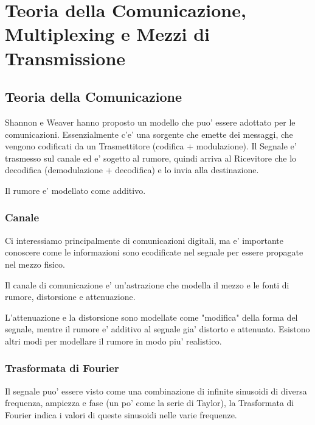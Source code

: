 \chapter{Teoria della Comunicazione, Multiplexing e Mezzi di Transmissione}

\section{Teoria della Comunicazione}

Shannon e Weaver hanno proposto un modello che puo' essere adottato per le comunicazioni. Essenzialmente c'e' una sorgente che emette dei messaggi, che vengono codificati da un Trasmettitore (codifica + modulazione). Il Segnale e' trasmesso sul canale ed e' sogetto al rumore, quindi arriva al Ricevitore che lo decodifica (demodulazione + decodifica) e lo invia alla destinazione.

Il rumore e' modellato come additivo.


\subsection{Canale}

Ci interessiamo principalmente di comunicazioni digitali, ma e' importante conoscere come le informazioni sono ecodificate nel segnale per essere propagate nel mezzo fisico.

Il canale di comunicazione e' un'astrazione che modella il mezzo e le fonti di rumore, distorsione e attenuazione.


L'attenuazione e la distorsione sono modellate come "modifica" della forma del segnale, mentre il rumore e' additivo al segnale gia' distorto e attenuato. Esistono altri modi per modellare il rumore in modo piu' realistico.


\subsection{Trasformata di Fourier}

Il segnale puo' essere visto come una combinazione di infinite sinusoidi di diversa frequenza, ampiezza e fase (un po' come la serie di Taylor), la Trasformata di Fourier indica i valori di queste sinusoidi nelle varie frequenze.

